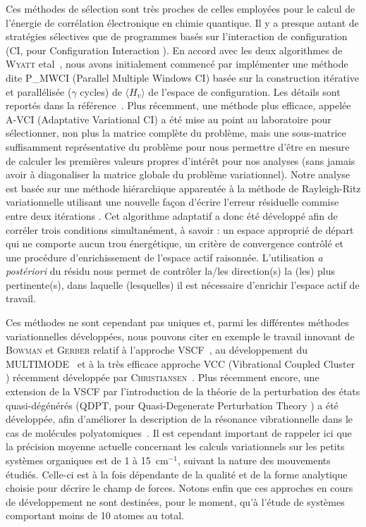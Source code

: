 \documentclass[12pt,a4paper]{book}
\begin{document}
Ces méthodes de sélection sont très proches de celles employées pour le calcul de l'énergie de corrélation électronique en chimie quantique. Il y a presque autant de stratégies sélectives que de programmes basés sur l'interaction de configuration (CI, pour \og Configuration Interaction \fg{}). En accord avec les deux algorithmes de \textsc{Wyatt} etal~\cite{wyatt1995toward}, nous avons initialement commencé par implémenter une méthode dite P\_MWCI (Parallel Multiple Windows CI) basée sur la construction itérative et parallélisée ($\gamma$ cycles) de $\langle H_{v} \rangle$ de l’espace de configuration. Les détails sont reportés dans la référence~\cite{begue2007comparison}. Plus récemment, une méthode plus efficace, appelée A-VCI (Adaptative Variational CI) a été mise au point au laboratoire pour sélectionner, non plus la matrice complète du problème, mais une sous-matrice suffisamment représentative du problème pour nous permettre d’être en mesure de calculer les premières valeurs propres d’intérêt pour nos analyses (sans jamais avoir à diagonaliser la matrice globale du problème variationnel). Notre analyse est basée sur une méthode hiérarchique apparentée à la méthode de Rayleigh-Ritz variationnelle utilisant une nouvelle façon d’écrire l’erreur résiduelle commise entre deux itérations \cite{garnier2016adaptive}. Cet algorithme adaptatif a donc été développé afin de corréler trois conditions simultanément, à savoir : un espace approprié de départ qui ne comporte aucun \og trou \fg{} énergétique, un critère de convergence contrôlé et une procédure d’enrichissement de l'espace actif raisonnée. L’utilisation \textit{a postériori} du résidu nous permet de contrôler la/les direction(s) la (les) plus pertinente(s), dans laquelle (lesquelles) il est nécessaire d’enrichir l’espace actif de travail.

Ces méthodes ne sont cependant pas uniques et, parmi les différentes méthodes variationnelles développées, nous pouvons citer en exemple le travail innovant de \textsc{Bowman} et \textsc{Gerber} relatif à l'approche VSCF~\cite{bowman1978self,bowman1986self,gerber1988self,gerber1979semiclassical}, au développement du MULTIMODE~\cite{carter2009high} et à la très efficace approche VCC (\og Vibrational Coupled Cluster \fg{}) récemment développée par \textsc{Christiansen}~\cite{sparta2010using}. Plus récemment encore, une extension de la VSCF par l'introduction de la théorie de la perturbation des états quasi-dégénérés (QDPT, pour \og Quasi-Degenerate Perturbation Theory \fg{}) a été développée, afin d'améliorer la description de la résonance vibrationnelle dans le cas de molécules polyatomiques~\cite{yagi2008vibrational}. Il est cependant important de rappeler ici que la précision moyenne actuelle concernant les calculs variationnels sur les petits systèmes organiques est de 1 à 15~cm$^{-1}$, suivant la nature des mouvements étudiés. Celle-ci est à la fois dépendante de la qualité et de la forme analytique choisie pour décrire le champ de forces. Notons enfin que ces approches en cours de développement ne sont destinées, pour le moment, qu’à l’étude de systèmes comportant moins de 10 atomes au total.
\end{document}
